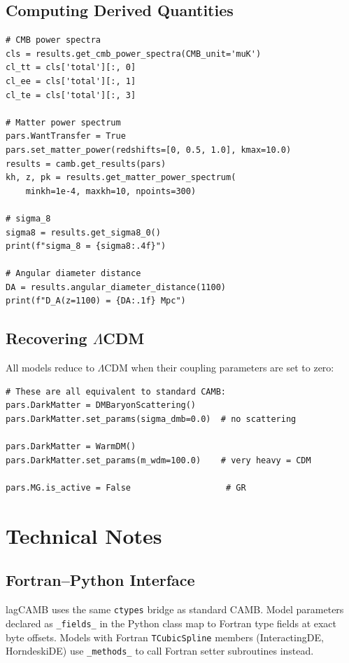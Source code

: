\documentclass[11pt,a4paper]{article}
\begin{document}
\subsection{Computing Derived Quantities}

\begin{lstlisting}
# CMB power spectra
cls = results.get_cmb_power_spectra(CMB_unit='muK')
cl_tt = cls['total'][:, 0]
cl_ee = cls['total'][:, 1]
cl_te = cls['total'][:, 3]

# Matter power spectrum
pars.WantTransfer = True
pars.set_matter_power(redshifts=[0, 0.5, 1.0], kmax=10.0)
results = camb.get_results(pars)
kh, z, pk = results.get_matter_power_spectrum(
    minkh=1e-4, maxkh=10, npoints=300)

# sigma_8
sigma8 = results.get_sigma8_0()
print(f"sigma_8 = {sigma8:.4f}")

# Angular diameter distance
DA = results.angular_diameter_distance(1100)
print(f"D_A(z=1100) = {DA:.1f} Mpc")
\end{lstlisting}

\subsection{Recovering $\Lambda$CDM}

All models reduce to $\Lambda$CDM when their coupling parameters are set to zero:

\begin{lstlisting}
# These are all equivalent to standard CAMB:
pars.DarkMatter = DMBaryonScattering()
pars.DarkMatter.set_params(sigma_dmb=0.0)  # no scattering

pars.DarkMatter = WarmDM()
pars.DarkMatter.set_params(m_wdm=100.0)    # very heavy = CDM

pars.MG.is_active = False                   # GR
\end{lstlisting}


\newpage
\section{Technical Notes}

\subsection{Fortran--Python Interface}

lagCAMB uses the same \texttt{ctypes} bridge as standard CAMB. Model parameters declared as \texttt{\_fields\_} in the Python class map to Fortran type fields at exact byte offsets. Models with Fortran \texttt{TCubicSpline} members (InteractingDE, HorndeskiDE) use \texttt{\_methods\_} to call Fortran setter subroutines instead.
\end{document}
